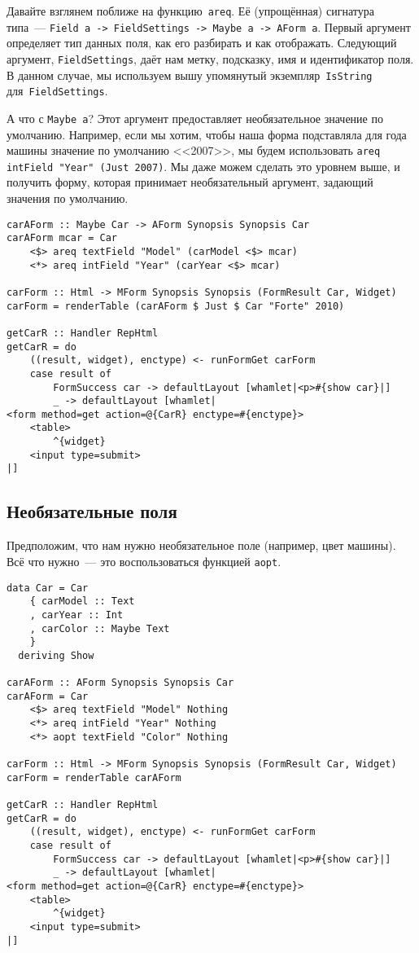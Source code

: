 Давайте взглянем поближе на функцию~\lstinline'areq'. Её (упрощённая)
сигнатура типа~--- \lstinline'Field a -> FieldSettings -> Maybe a -> AForm a'.
Первый аргумент определяет тип данных поля, как его разбирать и как
отображать.  Следующий аргумент, \lstinline'FieldSettings', даёт нам метку,
подсказку, имя и идентификатор поля. В данном случае, мы используем вышу
упомянутый экземпляр~\lstinline'IsString' для~\lstinline'FieldSettings'.

А что с \lstinline'Maybe a'? Этот аргумент предоставляет необязательное
значение по умолчанию.  Например, если мы хотим, чтобы наша форма подставляла
для года машины значение по умолчанию <<2007>>, мы будем использовать
\lstinline'areq intField "Year" (Just 2007)'. Мы даже можем сделать это
уровнем выше, и получить форму, которая принимает необязательный аргумент,
задающий значения по умолчанию.

\begin{lstlisting}[caption={Формы со значениями по умолчанию}]
carAForm :: Maybe Car -> AForm Synopsis Synopsis Car
carAForm mcar = Car
    <$> areq textField "Model" (carModel <$> mcar)
    <*> areq intField "Year" (carYear <$> mcar)

carForm :: Html -> MForm Synopsis Synopsis (FormResult Car, Widget)
carForm = renderTable (carAForm $ Just $ Car "Forte" 2010)

getCarR :: Handler RepHtml
getCarR = do
    ((result, widget), enctype) <- runFormGet carForm
    case result of
        FormSuccess car -> defaultLayout [whamlet|<p>#{show car}|]
        _ -> defaultLayout [whamlet|
<form method=get action=@{CarR} enctype=#{enctype}>
    <table>
        ^{widget}
    <input type=submit>
|]
\end{lstlisting}

\subsection{Необязательные поля}
Предположим, что нам нужно необязательное поле (например, цвет машины). Всё
что нужно~--- это воспользоваться функцией \lstinline'aopt'.

\begin{lstlisting}[caption={Необязательные поля}]
data Car = Car
    { carModel :: Text
    , carYear :: Int
    , carColor :: Maybe Text
    }
  deriving Show

carAForm :: AForm Synopsis Synopsis Car
carAForm = Car
    <$> areq textField "Model" Nothing
    <*> areq intField "Year" Nothing
    <*> aopt textField "Color" Nothing

carForm :: Html -> MForm Synopsis Synopsis (FormResult Car, Widget)
carForm = renderTable carAForm

getCarR :: Handler RepHtml
getCarR = do
    ((result, widget), enctype) <- runFormGet carForm
    case result of
        FormSuccess car -> defaultLayout [whamlet|<p>#{show car}|]
        _ -> defaultLayout [whamlet|
<form method=get action=@{CarR} enctype=#{enctype}>
    <table>
        ^{widget}
    <input type=submit>
|]
\end{lstlisting}

